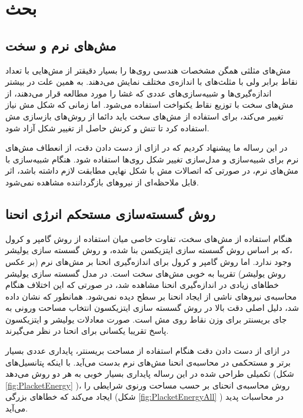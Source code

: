 \setRL
\clearpage

\section{
بحث
}
\subsection{مش‌های نرم و سخت}
مش‌های مثلثی همگن مشخصات هندسی روی‌ها را بسیار دقیقتر از مش‌هایی با تعداد نقاط برابر ولی با مثلث‌‌های با اندازه‌ی مختلف نمایش می‌دهند. به همین علت در بیشتر اندازه‌گیری‌ها و شبیه‌سازی‌های عددی که غشا را مورد مطالعه قرار می‌دهند، از مش‌های سخت با توزیع نقاط یکنواخت استفاده می‌شود. اما زمانی‌ که شکل مش‌ نیاز تغییر می‌کند، برای استفاده از مش‌های سخت باید دائما از روش‌های بازسازی مش استفاده کرد تا تنش و کرنش حاصل از تغییر شکل آزاد شود.

در این رساله ما پیشنهاد کردیم که در ازای از دست دادن دقت، از انعطاف مش‌های نرم برای شبیه‌سازی و مدل‌سازی تغییر شکل‌ روی‌ها استفاده شود. هنگام شبیه‌سازی با مش‌های نرم، در صورتی که اتصالات مش با شکل‌ نهایی مطابقت لازم داشته باشد، اثر قابل ملاحظه‌ای از نیرو‌های بازگرداننده مشاهده نمی‌شود.

\subsection{
روش گسسته‌سازی مستحکم انرژی انحنا
}
هنگام استفاده از مش‌های سخت، تفاوت خاصی میان استفاده از روش گامپر و کرول
\cite{Gompper1996}
،که بر اساس روش گسسته سازی ایتزیکسن 
\cite{Itzykson1986}
بنا شده، و روش گسسته سازی یولیشر
\cite{Julicher1996}
وجود ندارد. اما روش گامپر و کرول برای اندازه‌گیری انحنا بر مش‌های نرم (بر عکس روش یولیشر) تقریبا به خوبی مش‌های سخت است. در مدل گسسته سازی یولیشر خطا‌های زیادی در اندازه‌گیری انحنا مشاهده شد، در صورتی که این اختلاف هنگام محاسبه‌ی نیرو‌های ناشی از ایجاد انحنا بر سطح دیده نمی‌شود. همانطور که نشان داده شد، دلیل اصلی دقت بالا در روش گسسته سازی ایتزیکسون
\cite{Itzykson1986}
انتخاب مساحت ورونی به جای بریسنتر برای وزن نقاط روی مش است. صورت معادلات یولیشر و ایتزیکسون پاسخ تقریبا یکسانی برای انحنا در نظر می‌گیرند.

در ازای از دست دادن دقت هنگام استفاده از مساحت بریسنتر، پایداری عددی بسیار برتر و مستحکمی در محاسبه‌ی انحنا مش‌های نرم بدست می‌آید. با اینکه پتانسیل‌های تکمیلی طراحی شده در این رساله پایداری بسیار خوبی به هر دو روش می‌دهد (شکل
\ref{fig:PlacketEnergy}
)، روش محاسبه‌ی انحنای بر حسب مساحت ورنوی شرایطی را ایجاد می‌کند که خطا‌های بزرگی (شکل
\ref{fig:PlacketEnergyAll}
) در محاسبات پدید می‌آید.

